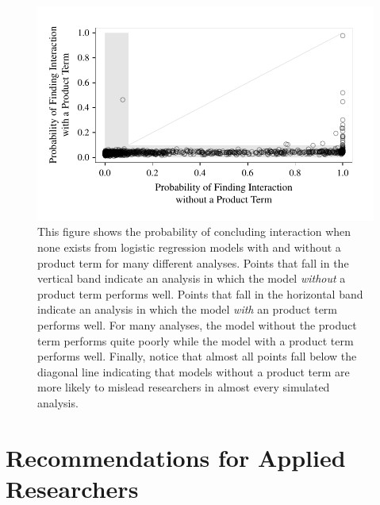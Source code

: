 \documentclass[12pt]{article}
\begin{document}
\begin{figure}[H]
\begin{center}
\includegraphics[scale = .9]{fig/fig-scatter.pdf}
\end{center}\caption{This figure shows the probability of concluding interaction when none exists from logistic regression models with and without a product term for many different analyses. Points that fall in the vertical band indicate an analysis in which the model \textit{without} a product term performs well. Points that fall in the horizontal band indicate an analysis in which the model \textit{with} an product term performs well. For many analyses, the model without the product term performs quite poorly while the model with a product term performs well. Finally, notice that almost all points fall below the diagonal line indicating that models without a product term are more likely to mislead researchers in almost every simulated analysis.}\label{fig:scatter}
\end{figure}

\section*{Recommendations for Applied Researchers}
\end{document}
